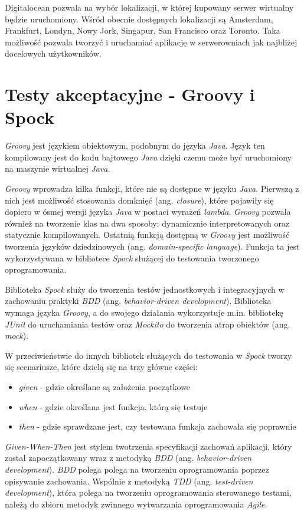 Digitalocean pozwala na wybór lokalizacji, w której kupowany serwer wirtualny będzie uruchomiony. Wśród obecnie dostępnych lokalizacji są Amsterdam, Frankfurt, Londyn, Nowy Jork, Singapur, San Francisco oraz Toronto. Taka możliwość pozwala tworzyć i uruchamiać aplikację w serwerowniach jak najbliżej docelowych użytkowników. 

\section{Testy akceptacyjne - Groovy i Spock}

\textsl{Groovy} jest językiem obiektowym, podobnym do języka \textsl{Java}. Język ten kompilowany jest do kodu bajtowego \textsl{Java} dzięki czemu może być uruchomiony na maszynie wirtualnej \textsl{Java}. 

\textsl{Groovy} wprowadza kilka funkcji, które nie są dostępne w języku \textsl{Java}. Pierwszą z nich jest możliwość stosowania domknięć (ang. \textsl{closure}), które pojawiły się dopiero w ósmej wersji języka \textsl{Java} w postaci wyrażeń \textsl{lambda}. \textsl{Groovy} pozwala również na tworzenie klas na dwa sposoby: dynamicznie interpretowanych oraz statycznie kompilowanych. Ostatnią funkcją dostępną w \textsl{Groovy} jest możliwość tworzenia języków dziedzinowych (ang. \textsl{domain-specific language}). Funkcja ta jest wykorzystywana w bibliotece \textsl{Spock} służącej do testowania tworzonego oprogramowania.

Biblioteka \textsl{Spock} służy do tworzenia testów jednostkowych i integracyjnych w zachowaniu praktyki \textsl{BDD} (ang. \textsl{behavior-driven development}). Biblioteka wymaga języka \textsl{Groovy}, a do swojego działania wykorzystuje m.in. bibliotekę \textsl{JUnit} do uruchamiania testów oraz \textsl{Mockito} do tworzenia atrap obiektów (ang. \textsl{mock}). 

W przeciwieństwie do innych bibliotek służących do testowania w \textsl{Spock} tworzy się scenariusze, które dzielą się na trzy główne części: 
\begin{itemize}
    \item \textsl{given} - gdzie określane są założenia początkowe
    \item \textsl{when} - gdzie określana jest funkcja, którą się testuje
    \item \textsl{then} - gdzie sprawdzane jest, czy testowana funkcja zachowała się poprawnie
\end{itemize}
\textsl{Given-When-Then} jest stylem twotrzenia specyfikacji zachowań aplikacji, który został zapoczątkowany wraz z metodyką \textsl{BDD} (ang. \textsl{behavior-driven development}). \textsl{BDD} polega polega na tworzeniu oprogramowania poprzez opisywanie zachowania. Wspólnie z metodyką \textsl{TDD} (ang. \textsl{test-driven development}), która polega na tworzeniu oprogramowania sterowanego testami, należą do zbioru metodyk zwinnego wytwarzania oprogramowania \textsl{Agile}.